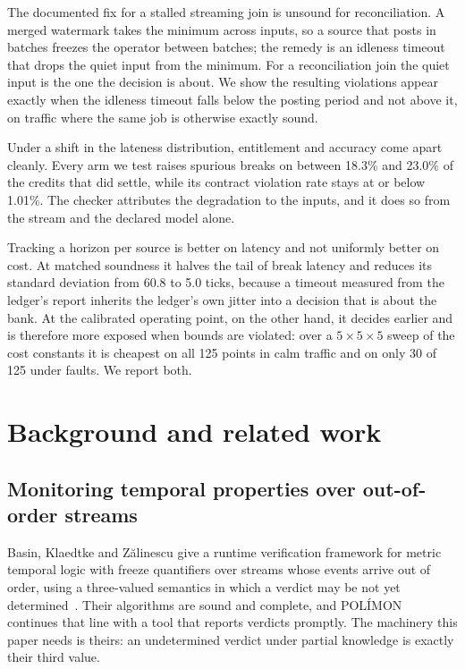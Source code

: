 \documentclass[10pt,conference]{IEEEtran}
\begin{document}
The documented fix for a stalled streaming join is unsound for reconciliation.
A merged watermark takes the minimum across inputs, so a source that posts in
batches freezes the operator between batches; the remedy is an idleness timeout
that drops the quiet input from the minimum. For a reconciliation join the
quiet input is the one the decision is about. We show the resulting violations
appear exactly when the idleness timeout falls below the posting period and not
above it, on traffic where the same job is otherwise exactly sound.

Under a shift in the lateness distribution, entitlement and accuracy come
apart cleanly. Every arm we test raises spurious breaks on between 18.3\% and
23.0\% of the credits that did settle, while its contract violation rate stays
at or below 1.01\%. The checker
attributes the degradation to the inputs, and it does so from the stream and
the declared model alone.

Tracking a horizon per source is better on latency and not uniformly better on
cost. At matched soundness it halves the tail of break latency and reduces its
standard deviation from 60.8 to 5.0 ticks, because a timeout measured from the
ledger's report inherits the ledger's own jitter into a decision that is about
the bank. At the calibrated operating point, on the other hand, it decides
earlier and is therefore more exposed when bounds are violated: over a
$5\times5\times5$ sweep of the cost constants it is cheapest on all 125 points
in calm traffic and on only 30 of 125 under faults. We report both.

\section{Background and related work}

\subsection{Monitoring temporal properties over out-of-order streams}

Basin, Klaedtke and Z\u{a}linescu give a runtime verification framework for
metric temporal logic with freeze quantifiers over streams whose events arrive
out of order, using a three-valued semantics in which a verdict may be not yet
determined~\cite{basin2019,basin2017}. Their algorithms are sound and complete,
and POL\'IMON~\cite{polimon} continues that line with a tool that reports
verdicts promptly. The machinery this paper needs is theirs: an undetermined
verdict under partial knowledge is exactly their third value.
\end{document}
